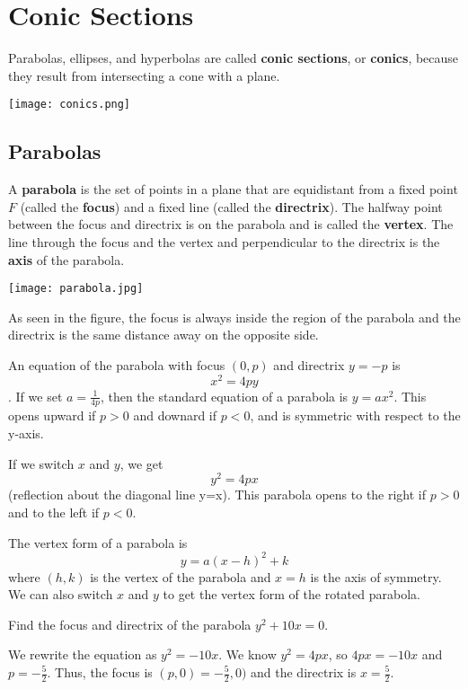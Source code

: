 \section{Conic Sections}
  Parabolas, ellipses, and hyperbolas are called \textbf{conic sections}, or \textbf{conics}, because they result from intersecting a cone with a plane.
  \begin{center}
    \texttt{[image: conics.png]}
  \end{center}
  \subsection*{Parabolas}
    A \textbf{parabola} is the set of points in a plane that are equidistant from a fixed point $F$ (called the \textbf{focus}) and a fixed line (called the \textbf{directrix}). The halfway point between the focus and directrix is on the parabola and is called the \textbf{vertex}. The line through the focus and the vertex and perpendicular to the directrix is the \textbf{axis} of the parabola.
    \begin{center}
      \texttt{[image: parabola.jpg]}
    \end{center}
    As seen in the figure, the focus is always inside the region of the parabola and the directrix is the same distance away on the opposite side.
    \begin{definition}
      An equation of the parabola with focus $(0,p)$ and directrix $y=-p$ is $$x^2=4py$$. If we set $a=\frac{1}{4p}$, then the standard equation of a parabola is $y=ax^2$. This opens upward if $p>0$ and downard if $p<0$, and is symmetric with respect to the y-axis.
    \end{definition}
    \begin{definition}
      If we switch $x$ and $y$, we get $$y^2=4px$$ (reflection about the diagonal line y=x). This parabola opens to the right if $p>0$ and to the left if $p<0$.
    \end{definition}
    \begin{definition}
      The vertex form of a parabola is
      $$y=a(x - h)^2 + k$$
      where $(h, k)$ is the vertex of the parabola and $x=h$ is the axis of symmetry. We can also switch $x$ and $y$ to get the vertex form of the rotated parabola.
    \end{definition}
    \begin{example}
      Find the focus and directrix of the parabola $y^2 + 10x = 0$.
    \end{example}
    \begin{solution}
      We rewrite the equation as $y^2=-10x$. We know $y^2=4px$, so $4px=-10x$ and $p=-\frac{5}{2}$. Thus, the focus is $(p,0)=-\frac{5}{2},0)$ and the directrix is $x=\frac{5}{2}$.
    \end{solution}
